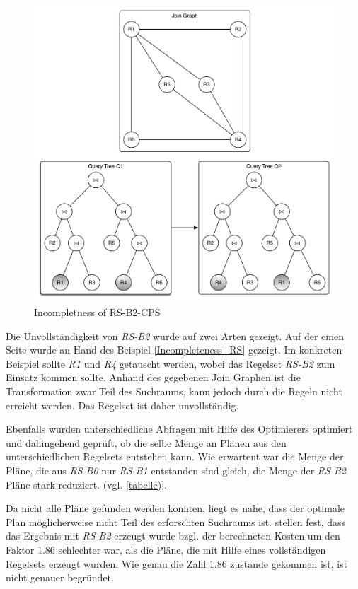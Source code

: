 \begin{figure}[ht]
  \centering
  \includegraphics[width=\textwidth]{02_Related_Work/Graphs.pdf}
  \caption{Incompletness of RS-B2-CPS}
  \label{Incompleteness_RS-B2-CPS}
\end{figure}


Die Unvollständigkeit von \textit{RS-B2} wurde auf zwei Arten gezeigt. Auf der einen Seite wurde an Hand des Beispiel \ref{Incompleteness_RS} gezeigt. Im konkreten Beispiel sollte \textit{R1} und \textit{R4} getauscht werden, wobei das Regelset \textit{RS-B2} zum Einsatz kommen sollte. Anhand des gegebenen Join Graphen ist die Transformation zwar Teil des Suchraums, kann jedoch durch die Regeln nicht erreicht werden. Das Regelset ist daher unvollständig.

Ebenfalls wurden unterschiedliche Abfragen mit Hilfe des Optimierers optimiert und dahingehend geprüft, ob die selbe Menge an Plänen aus den unterschiedlichen Regelsets entstehen kann. Wie erwartent war die Menge der Pläne, die aus \textit{RS-B0} nur \textit{RS-B1} entstanden sind gleich, die Menge der \textit{RS-B2} Pläne stark reduziert. (vgl. \ref{tabelle)}.

Da nicht alle Pläne gefunden werden konnten, liegt es nahe, dass der optimale Plan möglicherweise nicht Teil des erforschten Suchraums ist. \cite{shanbhag2014optimizing} stellen fest, dass das Ergebnis mit \textit{RS-B2} erzeugt wurde bzgl. der berechneten Kosten um den Faktor 1.86 schlechter war, als die Pläne, die mit Hilfe eines vollständigen Regelsets erzeugt wurden. Wie genau die Zahl 1.86 zustande gekommen ist, ist nicht genauer begründet.

